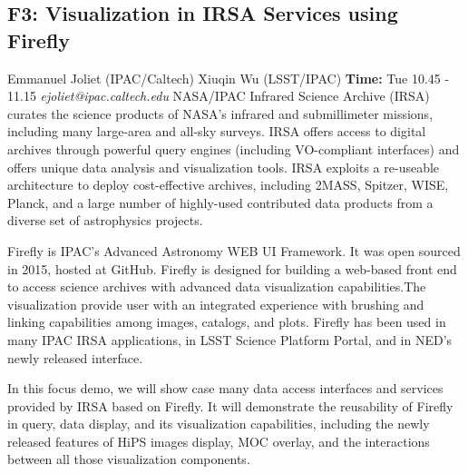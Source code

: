 \documentclass{report}
\begin{document}
\subsection*{F3: Visualization in IRSA Services using Firefly}
\bigskip
Emmanuel Joliet (IPAC/Caltech) \newline Xiuqin Wu (LSST/IPAC) \newline   \newline   \newline  \newline  \newline\newline
{\bf Time:} Tue 10.45 - 11.15\newline
\newline
{\it ejoliet@ipac.caltech.edu}\newline
\newline\newline
NASA/IPAC Infrared Science Archive (IRSA) curates the science products of NASA's infrared and submillimeter missions, including many large-area and all-sky surveys. IRSA offers access to digital archives through powerful query engines (including VO-compliant interfaces) and offers unique data analysis and visualization tools. IRSA exploits a re-useable architecture to deploy cost-effective archives, including 2MASS, Spitzer, WISE, Planck, and a large number of highly-used contributed data products from a diverse set of astrophysics projects.

Firefly is IPAC's Advanced Astronomy WEB UI Framework. It was  open sourced in 2015, hosted at GitHub. Firefly is designed for building a web-based front end to access science archives  with advanced data visualization capabilities.The visualization provide user with an integrated experience with brushing and linking capabilities among images, catalogs, and plots.  Firefly has been used in many IPAC IRSA applications, in LSST Science Platform Portal, and in NED’s newly released interface.

In this focus demo, we will show case many data access interfaces and services provided by IRSA based on Firefly. It will demonstrate the reusability of Firefly in query, data display, and its visualization capabilities, including the newly released features of HiPS images display, MOC overlay, and the interactions between all those visualization components.\newline
\newpage
\end{document}
